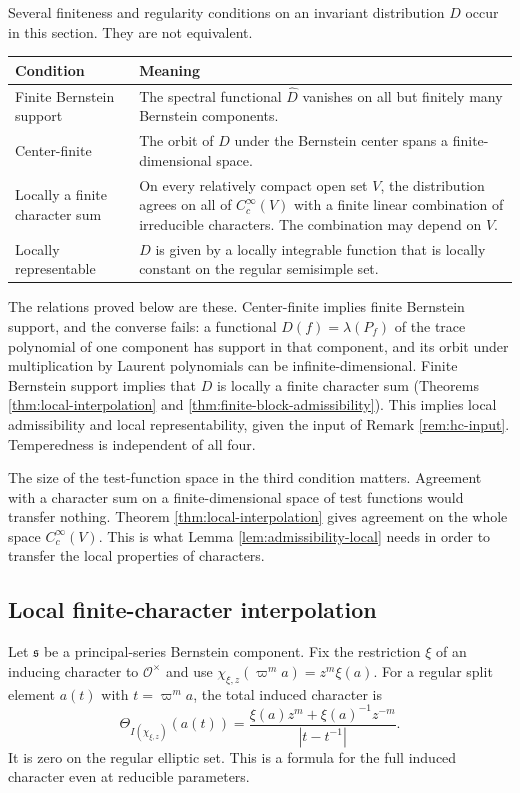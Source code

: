 \begin{remark}\label{rem:four-conditions}
Several finiteness and regularity conditions on an invariant distribution $D$ occur in this section. They are not equivalent.
\begin{center}\small
\begin{tabularx}{\linewidth}{@{}p{.3\linewidth}X@{}}\toprule
Condition & Meaning\\\midrule
Finite Bernstein support & The spectral functional $\widehat D$ vanishes on all but finitely many Bernstein components.\\
Center-finite & The orbit of $D$ under the Bernstein center spans a finite-dimensional space.\\
Locally a finite character sum & On every relatively compact open set $V$, the distribution agrees on all of $C_c^\infty(V)$ with a finite linear combination of irreducible characters. The combination may depend on $V$.\\
Locally representable & $D$ is given by a locally integrable function that is locally constant on the regular semisimple set.\\\bottomrule
\end{tabularx}
\end{center}
The relations proved below are these. Center-finite implies finite Bernstein support, and the converse fails: a functional $D(f)=\lambda(P_f)$ of the trace polynomial of one component has support in that component, and its orbit under multiplication by Laurent polynomials can be infinite-dimensional. Finite Bernstein support implies that $D$ is locally a finite character sum (Theorems \ref{thm:local-interpolation} and \ref{thm:finite-block-admissibility}). This implies local admissibility and local representability, given the input of Remark \ref{rem:hc-input}. Temperedness is independent of all four.

The size of the test-function space in the third condition matters. Agreement with a character sum on a finite-dimensional space of test functions would transfer nothing. Theorem \ref{thm:local-interpolation} gives agreement on the whole space $C_c^\infty(V)$. This is what Lemma \ref{lem:admissibility-local} needs in order to transfer the local properties of characters.
\end{remark}

\subsection{Local finite-character interpolation}
Let $\mathfrak s$ be a principal-series Bernstein component. Fix the restriction $\xi$ of an inducing character to $\mathcal O^\times$ and use $\chi_{\xi,z}(\varpi^m a)=z^m\xi(a)$. For a regular split element $a(t)$ with $t=\varpi^m a$, the total induced character is
\[
\Theta_{I(\chi_{\xi,z})}(a(t))=
\frac{\xi(a)z^m+\xi(a)^{-1}z^{-m}}{|t-t^{-1}|}.
\]
It is zero on the regular elliptic set. This is a formula for the full induced character even at reducible parameters.

